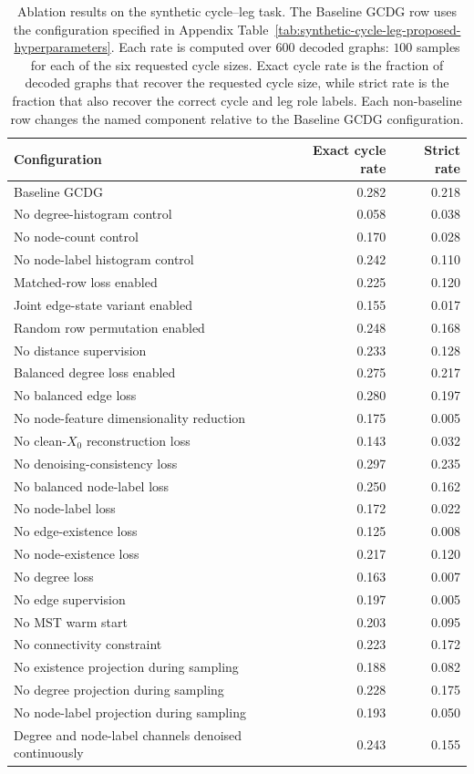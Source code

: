 \begin{table}[p]
\centering
\footnotesize
\begin{tabularx}{\textwidth}{@{}Xrr@{}}
\toprule
Configuration & Exact cycle rate & Strict rate \\
\midrule
Baseline GCDG & 0.282 & 0.218 \\
No degree-histogram control & 0.058 & 0.038 \\
No node-count control & 0.170 & 0.028 \\
No node-label histogram control & 0.242 & 0.110 \\
Matched-row loss enabled & 0.225 & 0.120 \\
Joint edge-state variant enabled & 0.155 & 0.017 \\
Random row permutation enabled & 0.248 & 0.168 \\
No distance supervision & 0.233 & 0.128 \\
Balanced degree loss enabled & 0.275 & 0.217 \\
No balanced edge loss & 0.280 & 0.197 \\
No node-feature dimensionality reduction & 0.175 & 0.005 \\
No clean-\(X_0\) reconstruction loss & 0.143 & 0.032 \\
No denoising-consistency loss & 0.297 & 0.235 \\
No balanced node-label loss & 0.250 & 0.162 \\
No node-label loss & 0.172 & 0.022 \\
No edge-existence loss & 0.125 & 0.008 \\
No node-existence loss & 0.217 & 0.120 \\
No degree loss & 0.163 & 0.007 \\
No edge supervision & 0.197 & 0.005 \\
No MST warm start & 0.203 & 0.095 \\
No connectivity constraint & 0.223 & 0.172 \\
No existence projection during sampling & 0.188 & 0.082 \\
No degree projection during sampling & 0.228 & 0.175 \\
No node-label projection during sampling & 0.193 & 0.050 \\
Degree and node-label channels denoised continuously & 0.243 & 0.155 \\
\bottomrule
\end{tabularx}
\caption{
Ablation results on the synthetic cycle--leg task. The Baseline GCDG row uses
the configuration specified in
Appendix Table~\ref{tab:synthetic-cycle-leg-proposed-hyperparameters}. Each
rate is computed over \(600\) decoded graphs:
\(100\) samples for each of the six requested cycle sizes. Exact cycle rate is
the fraction of decoded graphs that recover the requested cycle size, while
strict rate is the fraction that also recover the correct cycle and leg role
labels. Each non-baseline row changes the named component relative to the
Baseline GCDG configuration.
}
\label{tab:generator:synthetic-ablation-results}
\end{table}

